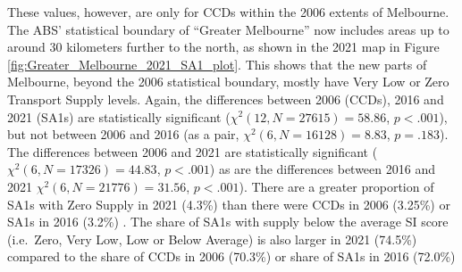 \documentclass[preprint, 3p,
authoryear]{elsarticle} %
\begin{document}
These values, however, are only for CCDs within the 2006 extents of
Melbourne. The ABS' statistical boundary of ``Greater Melbourne'' now
includes areas up to around 30 kilometers further to the north, as shown
in the 2021 map in Figure \ref{fig:Greater_Melbourne_2021_SA1_plot}.
This shows that the new parts of Melbourne, beyond the 2006 statistical
boundary, mostly have Very Low or Zero Transport Supply levels. Again,
the differences between 2006 (CCDs), 2016 and 2021 (SA1s) are
statistically significant (\(\chi^2(12, N = 27615) = 58.86\),
\(p < .001\)), but not between 2006 and 2016 (as a pair,
\(\chi^2(6, N = 16128) = 8.83\), \(p = .183\)). The differences between
2006 and 2021 are statistically significant
(\(\chi^2(6, N = 17326) = 44.83\), \(p < .001\)) as are the differences
between 2016 and 2021 \(\chi^2(6, N = 21776) = 31.56\), \(p < .001\)).
There are a greater proportion of SA1s with Zero Supply in 2021 (4.3\%)
than there were CCDs in 2006 (3.25\%) or SA1s in 2016 (3.2\%) . The
share of SA1s with supply below the average SI score (i.e.~Zero, Very
Low, Low or Below Average) is also larger in 2021 (74.5\%) compared to
the share of CCDs in 2006 (70.3\%) or share of SA1s in 2016 (72.0\%)
\end{document}
